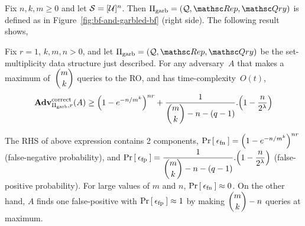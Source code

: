 Fix $n,k,m \geq 0$ and let $\mathcal{S}=[{\cal U}]^n$.  Then $\setprim_{\mathrm{garb}}= (\calQ,\Rep, \Qry)$ is defined as in Figure~\ref{fig:bf-and-garbled-bf} (right side).  The following result shows,

\begin{theorem}\label{thm:gbf-correctness}
Fix $r=1$, $k,m,n>0$, and let $\setprim_{\mathrm{garb}}= (\calQ,\Rep, \Qry)$ be the set-multiplicity data structure just described. For any adversary~$A$ that makes a maximum of~$\dbinom{m}{k}$ queries to the RO, and has time-complexity~$O(t)$,
\[
\mathrm{\mathbf{Adv}}^{\mathrm{correct}}_{\Pi_{\mathrm{garb}},r}(A)  \geq   \left(1 - e^{-n/m^k}\right)^{nr} + \dfrac{1}{\dbinom{m}{k}-n-(q-1)} . \Big(1-\dfrac{n}{2^\lambda}\Big)
\]

The RHS of above expression contains 2 components, $\Pr\left[\: \epsilon_{\mathrm{fn}} \:\right]= \left(1 - e^{-n/m^k}\right)^{nr}$ (false-negative probability), and $\Pr\left[\: \epsilon_{\mathrm{fp}} \:\right]=\dfrac{1}{\dbinom{m}{k}-n-(q-1)} . \Big(1-\dfrac{n}{2^\lambda}\Big)$ (false-positive probability). For large values of $m$ and $n$, $\Pr\left[\: \epsilon_{\mathrm{fn}} \:\right] \approx 0$. On the other hand, $A$ finds one false-positive with $\Pr\left[\: \epsilon_{\mathrm{fp}} \:\right] \approx 1$ by making $\dbinom{m}{k} - n$ queries at maximum.

\end{theorem}

